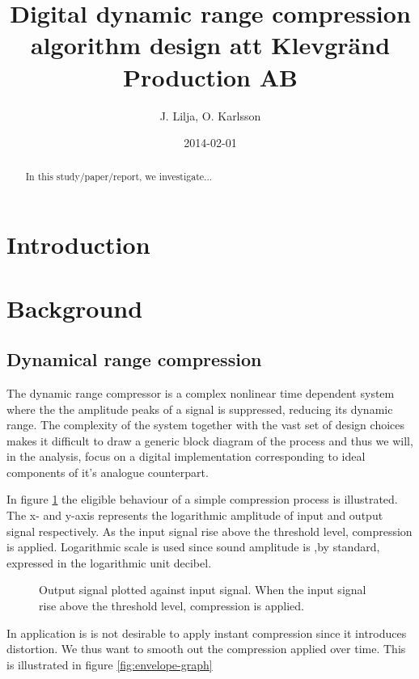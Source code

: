 \documentclass[]{article}
\begin{document}
\title{Digital dynamic range compression algorithm design att Klevgränd Production AB}
\author{J. Lilja, O. Karlsson}
\date{2014-02-01}
\maketitle

\begin{abstract}
In this study/paper/report, we investigate...
\end{abstract}

\clearpage
\section{Introduction}
\section{Background}
\subsection{Dynamical range compression}
The dynamic range compressor is a complex nonlinear time dependent system where the the amplitude peaks of a signal is suppressed, reducing its dynamic range. The complexity of the system together with the vast set of design choices makes it difficult to draw a generic block diagram of the process\cite{giannoullis}  and thus we will, in the analysis, focus on a digital implementation corresponding to ideal components of it's analogue counterpart. 

In figure \ref{fig:xy-graph} the eligible behaviour of a simple compression process is illustrated. The x- and y-axis represents the logarithmic amplitude of input and output signal respectively. As the input signal rise above the threshold level, compression is applied. Logarithmic scale is used since sound amplitude is ,by standard, expressed in the logarithmic unit decibel.

\begin{figure}[ht]
\centering

\caption{Output signal plotted against input signal. When the input signal rise above the threshold level, compression is applied.} 
\label{fig:xy-graph}
\end{figure}

In application is is not desirable to apply instant compression since it introduces distortion\cite{giannoullis}. We thus want to smooth out the compression applied over time. This is illustrated in figure \ref{fig:envelope-graph}
\end{document}
